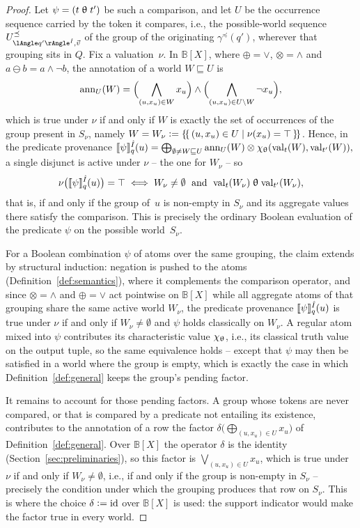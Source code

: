 \begin{proof}
Let $\psi=(t\mathrel{\uptheta} t')$ be such a comparison, and let $U$ be the occurrence
sequence carried by the token it compares, i.e., the possible-world
sequence $U^{\preceq}_{\angsem{\hat I}{q'},\vec v}$ of the group of the
originating $\gamma^{\preceq}(q')$, wherever that grouping sits in $Q$.
Fix a valuation~$\nu$. In $\mathbb{B}[X]$, where $\oplus=\lor$, $\otimes=\land$ and
$a\ominus b=a\land\lnot b$, the annotation of a world $W\sqsubseteq U$ is
\[
  \mathrm{ann}_U(W)=\Bigl(\bigwedge_{(u,x_u)\in W}x_u\Bigr)\land
            \Bigl(\bigwedge_{(u,x_u)\in U\setminus W}\lnot x_u\Bigr),
\]
which is true under $\nu$ if and only if $W$ is exactly the set of occurrences
of the group present in $S_\nu$, namely
$W=W_\nu\mathrel{\mathop:}=\{\!\{\,(u,x_u)\in U\mid\nu(x_u)=\top\,\}\!\}$. Hence, in the predicate
provenance
\(
  \llbracket \psi\rrbracket^{\hat I}_{q}(u)=\bigoplus_{\emptyset\neq W\sqsubseteq U}
  \mathrm{ann}_U(W)\otimes\chi_{\mathrel{\uptheta}}(\mathrm{val}_t(W),\mathrm{val}_{t'}(W)),
\)
a single disjunct is active under $\nu$ -- the one for $W_\nu$ -- so
\[
  \nu\bigl(\llbracket \psi\rrbracket^{\hat I}_{q}(u)\bigr)=\top
  \iff
  W_\nu\neq\emptyset \;\text{ and }\;
  \mathrm{val}_t(W_\nu)\mathrel{\uptheta}\mathrm{val}_{t'}(W_\nu),
\]
that is, if and only if the group of~$u$ is non-empty in $S_\nu$ and its
aggregate values there satisfy the comparison. This is precisely the ordinary
Boolean evaluation of the  predicate $\psi$ on the possible
world~$S_\nu$.

For a Boolean combination $\psi$ of atoms over the same grouping, the
claim extends by structural induction: negation is pushed
to the atoms (Definition~\ref{def:semantics}), where it complements the
comparison operator, and since $\otimes=\land$ and $\oplus=\lor$ act
pointwise on $\mathbb B[X]$ while all aggregate atoms of that grouping
share the same active world $W_\nu$, the predicate provenance
$\llbracket \psi\rrbracket^{\hat I}_{q}(u)$ is true under $\nu$ if and only if
$W_\nu\neq\emptyset$ and $\psi$ holds classically on $W_\nu$. A regular
atom mixed into $\psi$ contributes its characteristic value
$\chi_{\mathrel{\uptheta}}$, i.e., its classical truth value on the output tuple, so the
same equivalence holds -- except that $\psi$ may then be satisfied in a
world where the group is empty, which is exactly the case in which
Definition~\ref{def:general} keeps the group's pending factor.

It remains to account for those pending factors. A group whose tokens are
never compared, or that is compared by a predicate not entailing its
existence, contributes to the annotation of a row the factor
$\delta\bigl(\bigoplus_{(u,x_u)\in U}x_u\bigr)$ of
Definition~\ref{def:general}. Over $\mathbb B[X]$ the operator $\delta$ is
the identity (Section~\ref{sec:preliminaries}), so this factor is
$\bigvee_{(u,x_u)\in U}x_u$, which is true under $\nu$ if and only if
$W_\nu\neq\emptyset$, i.e., if and only if the group is non-empty in
$S_\nu$ -- precisely the condition under which the grouping produces that
row on $S_\nu$. This is where the choice $\delta\mathrel{\mathop:}=\mathrm{id}$ over
$\mathbb B[X]$ is used: the support indicator would make the factor true
in every world.


\end{proof}
